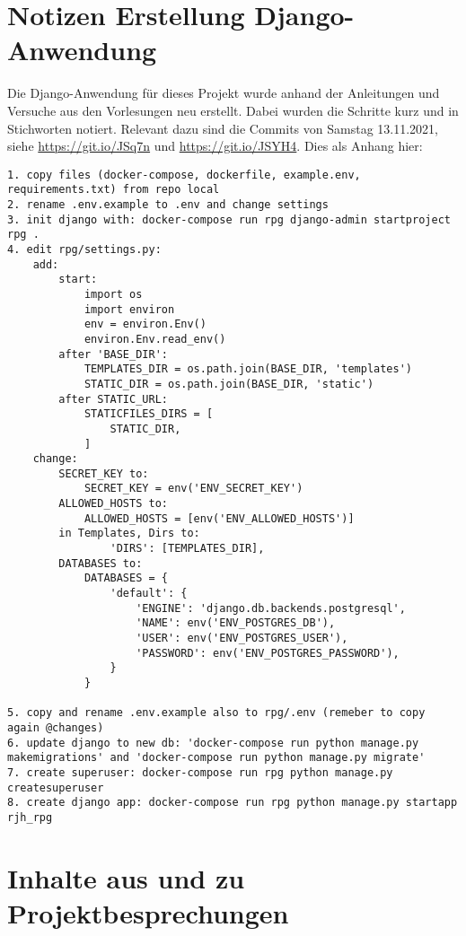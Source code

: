 \section{Notizen Erstellung Django-Anwendung} \label{django-init}

Die Django-Anwendung für dieses Projekt wurde anhand der Anleitungen und Versuche aus den Vorlesungen neu erstellt. Dabei wurden die Schritte kurz und in Stichworten notiert. Relevant dazu sind die Commits von Samstag 13.11.2021, siehe \url{https://git.io/JSq7n} und \url{https://git.io/JSYH4}. Dies als Anhang hier: 

\begin{lstlisting}1. copy files (docker-compose, dockerfile, example.env, requirements.txt) from repo local
2. rename .env.example to .env and change settings 
3. init django with: docker-compose run rpg django-admin startproject rpg .
4. edit rpg/settings.py:
    add:
        start:
            import os
            import environ
            env = environ.Env()
            environ.Env.read_env()
        after 'BASE_DIR':
            TEMPLATES_DIR = os.path.join(BASE_DIR, 'templates')
            STATIC_DIR = os.path.join(BASE_DIR, 'static')
        after STATIC_URL:
            STATICFILES_DIRS = [
                STATIC_DIR,
            ]
    change: 
        SECRET_KEY to:
            SECRET_KEY = env('ENV_SECRET_KEY')
        ALLOWED_HOSTS to:
            ALLOWED_HOSTS = [env('ENV_ALLOWED_HOSTS')]
        in Templates, Dirs to:
                'DIRS': [TEMPLATES_DIR],
        DATABASES to:
            DATABASES = {
                'default': {
                    'ENGINE': 'django.db.backends.postgresql',
                    'NAME': env('ENV_POSTGRES_DB'),
                    'USER': env('ENV_POSTGRES_USER'),
                    'PASSWORD': env('ENV_POSTGRES_PASSWORD'),
                }
            }

5. copy and rename .env.example also to rpg/.env (remeber to copy again @changes)
6. update django to new db: 'docker-compose run python manage.py makemigrations' and 'docker-compose run python manage.py migrate'
7. create superuser: docker-compose run rpg python manage.py createsuperuser
8. create django app: docker-compose run rpg python manage.py startapp rjh_rpg \end{lstlisting}
    


\section{Inhalte aus und zu Projektbesprechungen}

